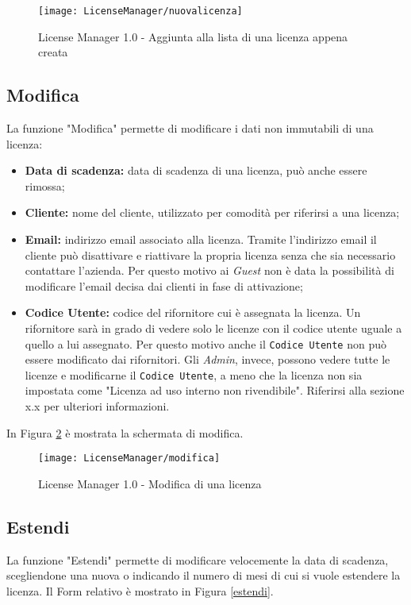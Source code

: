 \begin{figure}[!h] 
    \centering 
    \texttt{[image: LicenseManager/nuovalicenza]} 
    \caption{License Manager 1.0 - Aggiunta alla lista di una licenza appena creata}
\label{nuova}
\end{figure}

\subsection{Modifica}

La funzione "Modifica" permette di modificare i dati non immutabili di una licenza:
\begin{itemize}
\item \textbf{Data di scadenza:} data di scadenza di una licenza, può anche essere rimossa;
\item \textbf{Cliente:} nome del cliente, utilizzato per comodità per riferirsi a una licenza;
\item \textbf{Email:} indirizzo email associato alla licenza. Tramite l’indirizzo email il cliente può disattivare e riattivare la propria licenza senza che sia necessario contattare l’azienda. Per questo motivo ai \textit{Guest} non è data la possibilità di modificare l’email decisa dai clienti in fase di attivazione;
\item \textbf{Codice Utente:} codice del rifornitore cui è assegnata la licenza. Un rifornitore sarà in grado di vedere solo le licenze con il codice utente uguale a quello a lui assegnato. Per questo motivo anche il \texttt{Codice Utente} non può essere modificato dai rifornitori.
Gli \textit{Admin}, invece, possono vedere tutte le licenze e modificarne il \texttt{Codice Utente}, a meno che la licenza non sia impostata come "Licenza ad uso interno non rivendibile". Riferirsi alla sezione x.x per ulteriori informazioni.
\end{itemize} 

In Figura \ref{modifica} è mostrata la schermata di modifica.

\begin{figure}[!h] 
    \centering 
    \texttt{[image: LicenseManager/modifica]} 
    \caption{License Manager 1.0 - Modifica di una licenza}
\label{modifica}
\end{figure}

\subsection{Estendi}
La funzione "Estendi" permette di modificare velocemente la data di scadenza, scegliendone una nuova o indicando il numero di mesi di cui si vuole estendere la licenza.
Il Form relativo è mostrato in Figura \ref{estendi}.

